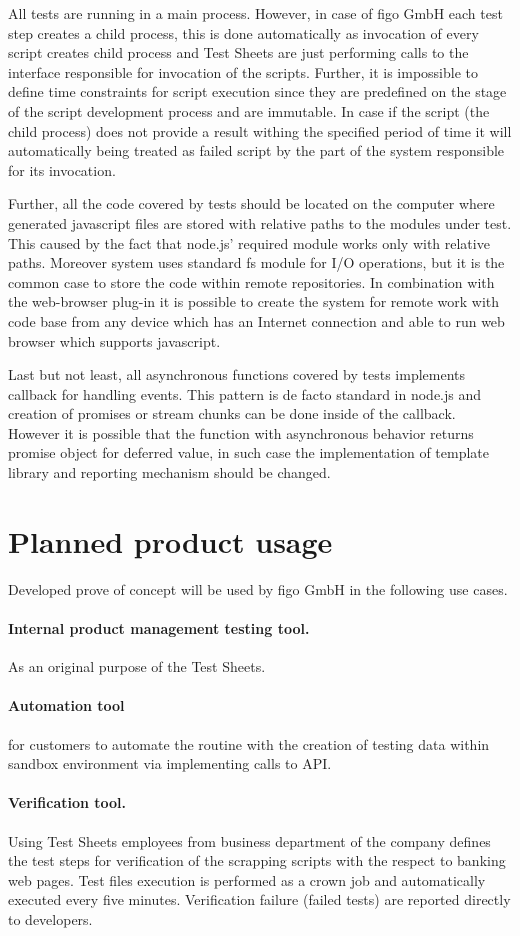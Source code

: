 All tests are running in a main process. However, in case of figo GmbH each test step creates a child process, this is done automatically as invocation of every script creates child process and Test Sheets are just performing calls to the interface responsible for invocation of the scripts. Further, it is impossible to define time constraints for script execution since they are predefined on the stage of the script development process and are immutable. In case if the script (the child process) does not provide a result withing the specified period of time it will automatically being treated as failed script by the part of the system responsible for its invocation.

Further, all the code covered by tests should be located on the computer where generated javascript files are stored with relative paths to the modules under test. This caused by the fact that node.js' required module works only with relative paths. Moreover system uses standard fs module for I/O operations, but it is the common case to store the code within remote repositories. In combination with the web-browser plug-in it is possible to create the system for remote work with code base from any device which has an Internet connection and able to run web browser which supports javascript.

Last but not least, all asynchronous functions covered by tests implements callback for handling events. This pattern is de facto standard in node.js and creation of promises or stream chunks can be done inside of the callback. However it is possible that the function with asynchronous behavior returns promise object for deferred value, in such case the implementation of template library and reporting mechanism should be changed.

\section{Planned product usage}
Developed prove of concept will be used by figo GmbH in the following use cases.

\paragraph{Internal product management testing tool.} As an original purpose of the Test Sheets.
\paragraph{Automation tool} for customers to automate the routine with the creation of testing data within sandbox environment via implementing calls to API.
\paragraph{Verification tool.} Using Test Sheets employees from business department of the company defines the test steps for verification of the scrapping scripts with the respect to banking web pages. Test files execution is performed as a crown job and automatically executed every five minutes. Verification failure (failed tests) are reported directly to developers.




